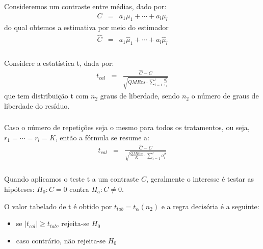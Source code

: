 \documentclass[14pt,aspectratio=1610]{beamer}
\begin{document}
\begin{frame}{}
\frametitle{}
\begin{block}{}
\justifying
Consideremos um contraste entre médias, dado por:
\begin{eqnarray*}
C &=& a_1\mu_1 + \cdots + a_l\mu_l
\end{eqnarray*}
do qual obtemos a estimativa por meio do estimador
\begin{eqnarray*}
\hat{C} &=& a_1\hat{\mu}_1 + \cdots + a_l\hat{\mu}_l
\end{eqnarray*}
\end{block}
\end{frame}

\begin{frame}{}
\frametitle{}
\begin{block}{}
\justifying
Considere a estatística t, dada por:
\begin{eqnarray*}
t_{cal} &=& \frac{\hat{C} - C}{\sqrt{QMRes \cdot {\displaystyle \sum_{i=1}^{l}\frac{a_i^2}{r_i}}}}
\end{eqnarray*}
que tem distribuição t com $n_2$ graus de liberdade, sendo $n_2$ o número de graus de liberdade do resíduo.
\end{block}
\end{frame}

\begin{frame}{}
\frametitle{}
\begin{block}{}
\justifying
Caso o número de repetições seja o mesmo para todos os tratamentos, ou seja, $r_1 = \cdots = r_l = K$, então a fórmula se resume a:
\begin{eqnarray*}
t_{cal} &=& \frac{\hat{C} - C}{\sqrt{\frac{QMRes}{K} \cdot {\displaystyle \sum_{i=1}^{l}a_i^2}}}
\end{eqnarray*}
\end{block}
\end{frame}

\begin{frame}{}
\frametitle{}
\begin{block}{}
\justifying
Quando aplicamos o teste t a um contraste $C$, geralmente o interesse é testar as hipóteses: $H_0: C = 0$ contra $H_a: C \neq 0$.

O valor tabelado de t é obtido por $t_{tab} = t_{\alpha}(n_2)$ e a regra decisória é a seguinte:
\begin{itemize}
  \item se $|t_{cal}| \geq t_{tab}$, rejeita-se $H_0$
  \item caso contrário, não rejeita-se $H_0$
\end{itemize}

\end{block}
\end{frame}
\end{document}
